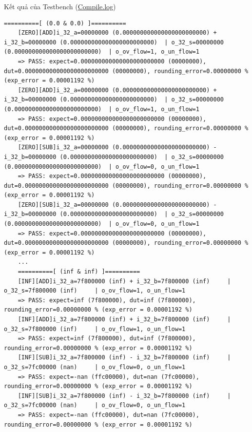 Kết quả của Testbench (\href{https://github.com/Noname-29-lnin/Floating_point/blob/main/Version_Final2/03_verif/Topmodule/Xcelium/compile.log}{Compile.log})

\begin{lstlisting}[style=StyleResult, language=Result, basicstyle=\fontsize{5}{6}\selectfont\ttfamily,caption={Kết quả của Testbench.}]
	==========[ (0.0 & 0.0) ]==========
	[ZERO][ADD]i_32_a=00000000 (0.000000000000000000000000) + i_32_b=00000000 (0.000000000000000000000000) 	| o_32_s=00000000 (0.000000000000000000000000) 	| o_ov_flow=1, o_un_flow=1
	=> PASS: expect=0.000000000000000000000000 (00000000), dut=0.000000000000000000000000 (00000000), rounding_error=0.00000000 % (exp_error = 0.00001192 %)
	[ZERO][ADD]i_32_a=00000000 (0.000000000000000000000000) + i_32_b=00000000 (0.000000000000000000000000) 	| o_32_s=00000000 (0.000000000000000000000000) 	| o_ov_flow=1, o_un_flow=1
	=> PASS: expect=0.000000000000000000000000 (00000000), dut=0.000000000000000000000000 (00000000), rounding_error=0.00000000 % (exp_error = 0.00001192 %)
	[ZERO][SUB]i_32_a=00000000 (0.000000000000000000000000) - i_32_b=00000000 (0.000000000000000000000000) 	| o_32_s=00000000 (0.000000000000000000000000) 	| o_ov_flow=0, o_un_flow=1
	=> PASS: expect=0.000000000000000000000000 (00000000), dut=0.000000000000000000000000 (00000000), rounding_error=0.00000000 % (exp_error = 0.00001192 %)
	[ZERO][SUB]i_32_a=00000000 (0.000000000000000000000000) - i_32_b=00000000 (0.000000000000000000000000) 	| o_32_s=00000000 (0.000000000000000000000000) 	| o_ov_flow=0, o_un_flow=1
	=> PASS: expect=0.000000000000000000000000 (00000000), dut=0.000000000000000000000000 (00000000), rounding_error=0.00000000 % (exp_error = 0.00001192 %)
	...
	==========[ (inf & inf) ]==========
	[INF][ADD]i_32_a=7f800000 (inf) + i_32_b=7f800000 (inf) 	| o_32_s=7f800000 (inf) 	| o_ov_flow=1, o_un_flow=1
	=> PASS: expect=inf (7f800000), dut=inf (7f800000), rounding_error=0.00000000 % (exp_error = 0.00001192 %)
	[INF][ADD]i_32_a=7f800000 (inf) + i_32_b=7f800000 (inf) 	| o_32_s=7f800000 (inf) 	| o_ov_flow=1, o_un_flow=1
	=> PASS: expect=inf (7f800000), dut=inf (7f800000), rounding_error=0.00000000 % (exp_error = 0.00001192 %)
	[INF][SUB]i_32_a=7f800000 (inf) - i_32_b=7f800000 (inf) 	| o_32_s=7fc00000 (nan) 	| o_ov_flow=0, o_un_flow=1
	=> PASS: expect=-nan (ffc00000), dut=nan (7fc00000), rounding_error=0.00000000 % (exp_error = 0.00001192 %)
	[INF][SUB]i_32_a=7f800000 (inf) - i_32_b=7f800000 (inf) 	| o_32_s=7fc00000 (nan) 	| o_ov_flow=0, o_un_flow=1
	=> PASS: expect=-nan (ffc00000), dut=nan (7fc00000), rounding_error=0.00000000 % (exp_error = 0.00001192 %)

\end{lstlisting}
